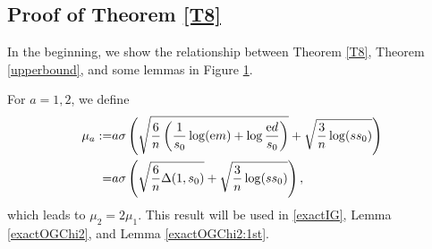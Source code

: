 \documentclass[12pt]{article}
\begin{document}
\begin{appendix}
\subsection{Proof of Theorem \ref{T8}}\label{T4proof}
In the beginning, we show the relationship between Theorem \ref{T8}, Theorem \ref{upperbound}, and some lemmas in Figure \ref{roadmap2}.

\begin{figure}[omitted: a diagram of this paper's results, not reproduced here]\label{roadmap2}\end{figure}
 

For $a =1,2$, we define
\begin{equation}\label{mua}
\begin{aligned}
    \mu_a :=& a\sigma \left( \sqrt{ \frac{6}{n} \left( \frac{1}{s_0}\log ({\rm e} m ) +  \log \frac{{\rm e} d}{s_0} \right)  } + \sqrt{ \frac{3}{n} \log(ss_0) } \right)\\
 =&  a\sigma \left( \sqrt{ \frac{6}{n} \Delta(1,s_0) } + \sqrt{ \frac{3}{n} \log(ss_0) } \right),
\end{aligned}
\end{equation}
which leads to $\mu_2 = 2 \mu_1$. This result will be used in \eqref{exactIG}, Lemma \ref{exactOGChi2}, and Lemma \ref{exactOGChi2:1st}.


\end{appendix}
\end{document}
